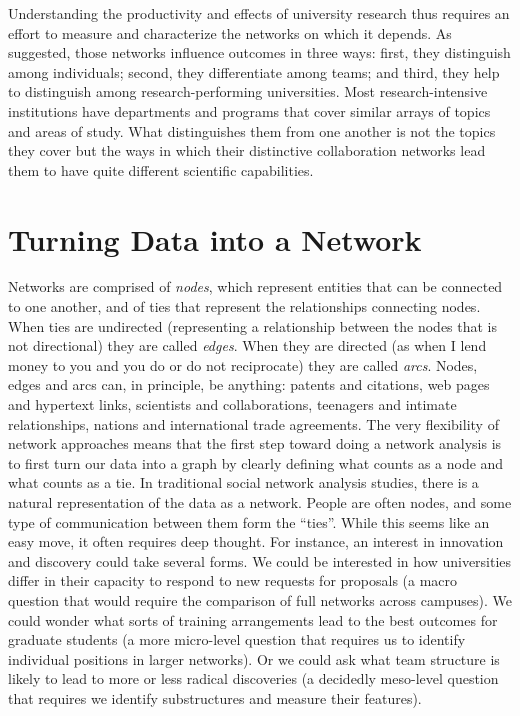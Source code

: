 \documentclass[]{krantz}
\begin{document}
Understanding the productivity and effects of university research thus
requires an effort to measure and characterize the networks on which it
depends. As suggested, those networks influence outcomes in three ways:
first, they distinguish among individuals; second, they differentiate
among teams; and third, they help to distinguish among
research-performing universities. Most research-intensive institutions
have departments and programs that cover similar arrays of topics and
areas of study. What distinguishes them from one another is not the
topics they cover but the ways in which their distinctive collaboration
networks lead them to have quite different scientific capabilities.

\section{Turning Data into a Network}\label{turning-data-into-a-network}

Networks are comprised of \emph{nodes}, which represent entities that
can be connected to one another, and of ties that represent the
relationships connecting nodes. When ties are undirected (representing a
relationship between the nodes that is not directional) they are called
\emph{edges}. When they are directed (as when I lend money to you and
you do or do not reciprocate) they are called \emph{arcs}. Nodes, edges
and arcs can, in principle, be anything: patents and citations, web
pages and hypertext links, scientists and collaborations, teenagers and
intimate relationships, nations and international trade agreements. The
very flexibility of network approaches means that the first step toward
doing a network analysis is to first turn our data into a graph by
clearly defining what counts as a node and what counts as a tie. In
traditional social network analysis studies, there is a natural
representation of the data as a network. People are often nodes, and
some type of communication between them form the ``ties''. While this
seems like an easy move, it often requires deep thought. For instance,
an interest in innovation and discovery could take several forms. We
could be interested in how universities differ in their capacity to
respond to new requests for proposals (a macro question that would
require the comparison of full networks across campuses). We could
wonder what sorts of training arrangements lead to the best outcomes for
graduate students (a more micro-level question that requires us to
identify individual positions in larger networks). Or we could ask what
team structure is likely to lead to more or less radical discoveries (a
decidedly meso-level question that requires we identify substructures
and measure their features).
\end{document}

